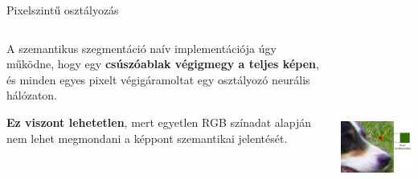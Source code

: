 \documentclass[english, aspectratio=169]{beamer}
\begin{document}
\begin{frame}{Pixelszintű osztályozás}
\begin{columns}
\begin{column}{.5\textwidth}
A szemantikus szegmentáció naív implementációja úgy működne, hogy egy \textbf{csúszóablak végigmegy a teljes képen}, és minden egyes pixelt végigáramoltat egy osztályozó neurális hálózaton.\par\smallskip
\textbf{Ez viszont lehetetlen}, mert egyetlen RGB színadat alapján nem lehet megmondani a képpont szemantikai jelentését.
\end{column}
\begin{column}{.5\textwidth}
\begin{center}
\includegraphics[height=7cm, width=7cm, keepaspectratio]{images/instance_7.png}
\end{center}
\end{column}
\end{columns}
\end{frame}
\end{document}
